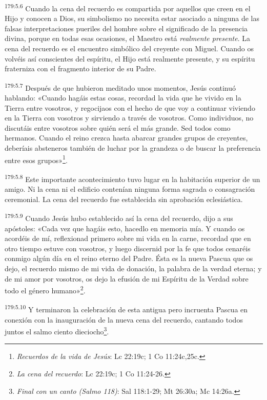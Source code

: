 \par
\textsuperscript{179:5.6} Cuando la cena del recuerdo es compartida por aquellos que creen en el Hijo y conocen a Dios, su simbolismo no necesita estar asociado a ninguna de las falsas interpretaciones pueriles del hombre sobre el significado de la presencia divina, porque en todas esas ocasiones, el Maestro está \textit{realmente presente}. La cena del recuerdo es el encuentro simbólico del creyente con Miguel. Cuando os volvéis así conscientes del espíritu, el Hijo está realmente presente, y su espíritu fraterniza con el fragmento interior de su Padre.

\par
\textsuperscript{179:5.7} Después de que hubieron meditado unos momentos, Jesús continuó hablando: «Cuando hagáis estas cosas, recordad la vida que he vivido en la Tierra entre vosotros, y regocijaos con el hecho de que voy a continuar viviendo en la Tierra con vosotros y sirviendo a través de vosotros. Como individuos, no discutáis entre vosotros sobre quién será el más grande. Sed todos como hermanos. Cuando el reino crezca hasta abarcar grandes grupos de creyentes, deberíais absteneros también de luchar por la grandeza o de buscar la preferencia entre esos grupos»\footnote{\textit{Recuerdos de la vida de Jesús}: Lc 22:19c; 1 Co 11:24c,25c.}.

\par
\textsuperscript{179:5.8} Este importante acontecimiento tuvo lugar en la habitación superior de un amigo. Ni la cena ni el edificio contenían ninguna forma sagrada o consagración ceremonial. La cena del recuerdo fue establecida sin aprobación eclesiástica.

\par
\textsuperscript{179:5.9} Cuando Jesús hubo establecido así la cena del recuerdo, dijo a sus apóstoles: «Cada vez que hagáis esto, hacedlo en memoria mía. Y cuando os acordéis de mí, reflexionad primero sobre mi vida en la carne, recordad que en otro tiempo estuve con vosotros, y luego discernid por la fe que todos cenaréis conmigo algún día en el reino eterno del Padre. Ésta es la nueva Pascua que os dejo, el recuerdo mismo de mi vida de donación, la palabra de la verdad eterna; y de mi amor por vosotros, os dejo la efusión de mi Espíritu de la Verdad sobre todo el género humano»\footnote{\textit{La cena del recuerdo}: Lc 22:19c; 1 Co 11:24-26.}.

\par
\textsuperscript{179:5.10} Y terminaron la celebración de esta antigua pero incruenta Pascua en conexión con la inauguración de la nueva cena del recuerdo, cantando todos juntos el salmo ciento dieciocho\footnote{\textit{Final con un canto (Salmo 118)}: Sal 118:1-29; Mt 26:30a; Mc 14:26a.}.